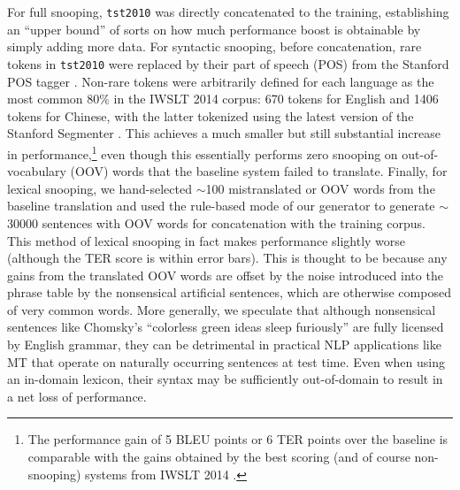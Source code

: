{\begin{table}[htb]
\caption{ \label{tab:snooping} %
Data snooping results for systems trained on information from the {\small \tt tst2010} data set concatenated to the end of the IWSLT 2014 training corpus and also evaluated with MultEval on {\small \tt tst2010}.
The different types of snooping are defined in the text.
} %
\end{table}

For full snooping, {\small \tt tst2010} was directly concatenated to the training, establishing an ``upper bound'' of sorts on how much performance boost is obtainable by simply adding more data.
For syntactic snooping, before concatenation, rare tokens in {\small \tt tst2010} were replaced by their part of speech (POS) from the Stanford POS tagger . 
Non-rare tokens were arbitrarily defined for each language as the most common 80\% in the IWSLT 2014 corpus: 670 tokens for English and 1406 tokens for Chinese, with the latter tokenized using the latest version of the Stanford Segmenter .
This achieves a much smaller but still substantial increase in performance,\footnote{
    The performance gain of 5 BLEU points or 6 TER points over the baseline is comparable with the gains obtained by the best scoring (and of course non-snooping) systems from IWSLT 2014 .
} even though this essentially performs zero snooping on out-of-vocabulary (OOV) words that the baseline system failed to translate.
Finally, for lexical snooping, we hand-selected $\sim$100 mistranslated or OOV words from the baseline translation and used the rule-based mode of our generator to generate $\sim$30000 sentences with OOV words for concatenation with the training corpus.
This method of lexical snooping in fact makes performance slightly worse (although the TER score is within error bars).
This is thought to be because any gains from the translated OOV words are offset by the noise introduced into the phrase table by the nonsensical artificial sentences, which are otherwise composed of very common words. %
More generally, we speculate that although nonsensical sentences like Chomsky's ``colorless green ideas sleep furiously'' are fully licensed by English grammar, they can be detrimental in practical NLP applications like MT that operate on naturally occurring sentences at test time.
Even when using an in-domain lexicon, their syntax may be sufficiently out-of-domain to result in a net loss of performance.

}
